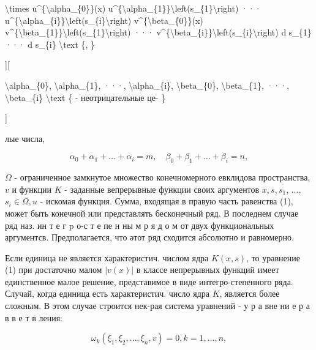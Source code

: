 \documentclass[10pt]{article}
\begin{document}
\textbackslash times u\^{}\{\textbackslash alpha\_\{0\}\}(x) u\^{}\{\textbackslash alpha\_\{1\}\}\textbackslash left(s\_\{1\}\textbackslash right) ··· u\^{}\{\textbackslash alpha\_\{i\}\}\textbackslash left(s\_\{i\}\textbackslash right) v\^{}\{\textbackslash beta\_\{0\}\}(x) v\^{}\{\textbackslash beta\_\{1\}\}\textbackslash left(s\_\{1\}\textbackslash right) ··· v\^{}\{\textbackslash beta\_\{i\}\}\textbackslash left(s\_\{i\}\textbackslash right) d s\_\{1\} ··· d s\_\{i\} \textbackslash text \{, \}



][



\textbackslash alpha\_\{0\}, \textbackslash alpha\_\{1\}, ···, \textbackslash alpha\_\{i\}, \textbackslash beta\_\{0\}, \textbackslash beta\_\{1\}, ···, \textbackslash beta\_\{i\} \textbackslash text \{ - неотрицательные це- \}

]



лые числа,



\[

\alpha_{0}+\alpha_{1}+\ldots+\alpha_{i}=m, \quad \beta_{0}+\beta_{1}+\ldots+\beta_{i}=n,

\]



$\Omega$ - ограниченное замкнутое множество конечномерного евклидова пространства, $v$ и функции $K$ - заданные вепрерывные функции своих аргументов $x, s, s_{1}$, ..., $s_{i} \in \Omega, u$ - искомая функция. Сумма, входящая в правую часть равенства (1), может быть конечной или представлять бесконечный ряд. В последнем случае ряд наз. ин т е г p о-с т е пе н ны м р я д о м от двух функциональных аргументсв. Предполагается, что әтот ряд сходится абсолютно и равномерно.



Если единица не является характеристич. числом ядра $K(x, s)$, то уравнение (1) при достаточно малом $|v(x)|$ в классе непрерывных функций имеет единственное малое решение, представимое в виде интегро-степенного ряда. Случай, когда единица есть характеристич. число ядра $K$, является более сложным. В этом случае строится нек-рая система уравнений - у р а вне ни е р а в в е т в ления:



\[

\omega_{k}\left(\xi_{1}, \xi_{2}, \ldots, \xi_{n}, v\right)=0, k=1, \ldots, n,

\]
\end{document}
